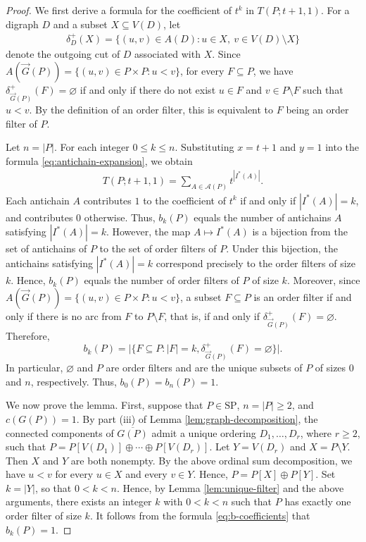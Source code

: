 \documentclass[11pt,a4paper]{article}
\begin{document}
\begin{proof}
We first derive a formula for the coefficient of $t^k$ in $T(P;t+1,1)$.
For a digraph $D$ and a subset $X\subseteq V(D)$, let
\begin{eqnarray*}
\delta_D^+(X)=\{(u,v)\in A(D):u\in X,\ v\in V(D)\setminus X\}
\end{eqnarray*}
denote the outgoing cut of $D$ associated with $X$.
Since $A(\vec G(P))=\{(u,v)\in P\times P:u<v\}$, for every $F\subseteq P$, 
we have $\delta_{\vec G(P)}^+(F)=\varnothing$ if and only if
there do not exist $u\in F$ and $v\in P\setminus F$ such that $u<v$.
By the definition of an order filter, this is equivalent
to $F$ being an order filter of $P$.

Let $n=|P|$.
For each integer $0\leq k\leq n$. %
Substituting $x=t+1$ and $y=1$ into the formula \eqref{eq:antichain-expansion}, we obtain
\begin{eqnarray*}
T(P;t+1,1)=\sum_{A\in\mathcal A(P)}t^{|I^*(A)|}.
\end{eqnarray*}
Each antichain $A$ contributes $1$ to the coefficient of $t^k$
if and only if $|I^*(A)|=k$, and contributes $0$ otherwise.
Thus, $b_k(P)$ equals the number of antichains $A$ satisfying $|I^*(A)|=k$.
However, the map $A\mapsto I^*(A)$ is a bijection from the set
of antichains of $P$ to the set of order filters of $P$.
Under this bijection, the antichains satisfying $|I^*(A)|=k$
correspond precisely to the order filters of size $k$.
Hence, $b_k(P)$ equals the number of order filters of $P$ of size $k$.
Moreover, since $A(\vec G(P))=\{(u,v)\in P\times P:u<v\}$,
a subset $F\subseteq P$ is an order filter if and only if
there is no arc from $F$ to $P\setminus F$,
that is, if and only if $\delta_{\vec G(P)}^+(F)=\varnothing$. Therefore,
\begin{equation}\label{eq:b-coefficients}
b_k(P)=\bigl|\{F\subseteq P:|F|=k,\delta_{\vec G(P)}^+(F)=\varnothing\}\bigr|.
\end{equation}
In particular, $\varnothing$ and $P$ are order filters
and are the unique subsets of $P$ of sizes $0$ and $n$, respectively.
Thus, $b_0(P)=b_n(P)=1$.

We now prove the lemma. 
First, suppose that $P\in\mathrm{SP}$, $n=|P|\geq 2$, and $c(G(P))=1$.
By part \textup{(iii)} of Lemma \ref{lem:graph-decomposition},
the connected components of $\overline{G(P)}$ admit a unique ordering $D_1,\ldots,D_r$, 
where $r\geq2$, such that $P=P[V(D_1)]\oplus\cdots\oplus P[V(D_r)]$.
Let $Y=V(D_r)$ and $X=P\setminus Y$. Then $X$ and $Y$ are both nonempty.
By the above ordinal sum decomposition, we have $u<v$ for every $u\in X$ and every $v\in Y$.
Hence, $P=P[X]\oplus P[Y]$. Set $k=|Y|$, so that $0<k<n$.
Hence, by Lemma \ref{lem:unique-filter} and the above arguments,
there exists an integer $k$ with $0<k<n$
such that $P$ has exactly one order filter of size $k$.
It follows from the formula \eqref{eq:b-coefficients} that $b_k(P)=1$.


\end{proof}
\end{document}
